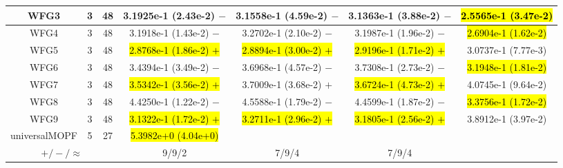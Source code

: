 \documentclass[journal]{IEEEtran}
\begin{document}
\begin{table*}[htbp]
\begin{tabular}{ccccccc}
\hline
\multirow{1}{*}{WFG3}&3&48&3.1925e-1 (2.43e-2) $-$&3.1558e-1 (4.59e-2) $-$&3.1363e-1 (3.88e-2) $-$&\hl{2.5565e-1 (3.47e-2)}\\
\hline
\multirow{1}{*}{WFG4}&3&48&3.1918e-1 (1.43e-2) $-$&3.2702e-1 (2.10e-2) $-$&3.1987e-1 (1.96e-2) $-$&\hl{2.6904e-1 (1.62e-2)}\\
\hline
\multirow{1}{*}{WFG5}&3&48&\hl{2.8768e-1 (1.86e-2) $+$}&\hl{2.8894e-1 (3.00e-2) $+$}&\hl{2.9196e-1 (1.71e-2) $+$}&3.0737e-1 (7.77e-3)\\
\hline
\multirow{1}{*}{WFG6}&3&48&3.4394e-1 (3.49e-2) $-$&3.6968e-1 (4.57e-2) $-$&3.7308e-1 (2.73e-2) $-$&\hl{3.1948e-1 (1.81e-2)}\\
\hline
\multirow{1}{*}{WFG7}&3&48&\hl{3.5342e-1 (3.56e-2) $+$}&3.7009e-1 (3.68e-2) $+$&\hl{3.6724e-1 (4.73e-2) $+$}&4.0745e-1 (9.64e-2)\\
\hline
\multirow{1}{*}{WFG8}&3&48&4.4250e-1 (1.22e-2) $-$&4.5588e-1 (1.79e-2) $-$&4.4599e-1 (1.87e-2) $-$&\hl{3.3756e-1 (1.72e-2)}\\
\hline
\multirow{1}{*}{WFG9}&3&48&\hl{3.1322e-1 (1.72e-2) $+$}&\hl{3.2711e-1 (2.96e-2) $+$}&\hl{3.1805e-1 (2.56e-2) $+$}&3.8912e-1 (3.97e-2)\\
\hline
\multirow{1}{*}{universalMOPF}&5&27&\hl{5.3982e+0 (4.04e+0)}&&&\\
\hline
\multicolumn{3}{c}{$+/-/\approx$}&9/9/2&7/9/4&7/9/4&\\
\bottomrule
\end{tabular}
\label{No Label}
\end{table*}
\end{document}
